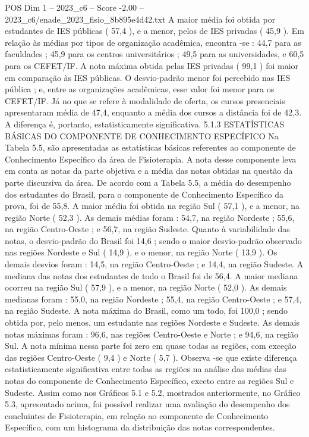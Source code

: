 \begin{textsample}{POS Dim 1 – 2023\_c6 – Score -2.00 – 2023\_c6/enade\_2023\_fisio\_8b895e4d42.txt}
A maior média foi obtida por estudantes de IES públicas ( 57,4 ), e a menor, pelos de IES privadas ( 45,9 ).
Em relação às médias por tipos de organização acadêmica, encontra -se : 44,7 para as faculdades ; 45,9 para os centros universitários ; 49,5 para as universidades, e 60,5 para os CEFET/IF.
A nota máxima obtida pelas IES privadas ( 99,1 ) foi maior em comparação às IES públicas.
O desvio-padrão menor foi percebido nas IES pública ; e, entre as organizações acadêmicas, esse valor foi menor para os CEFET/IF.
Já no que se refere à modalidade de oferta, os cursos presenciais apresentaram média de 47,4, enquanto a média dos cursos a distância foi de 42,3.
A diferença é, portanto, estatisticamente significativa. 5.1.3 ESTATÍSTICAS BÁSICAS DO COMPONENTE DE CONHECIMENTO ESPECÍFICO Na Tabela 5.5, são apresentadas as estatísticas básicas referentes ao componente de Conhecimento Específico da área de Fisioterapia.
A nota desse componente leva em conta as notas da parte objetiva e a média das notas obtidas na questão da parte discursiva da área.
De acordo com a Tabela 5.5, a média do desempenho dos estudantes do Brasil, para o componente de Conhecimento Específico da prova, foi de 55,8.
A maior média foi obtida na região Sul ( 57,1 ), e a menor, na região Norte ( 52,3 ).
As demais médias foram : 54,7, na região Nordeste ; 55,6, na região Centro-Oeste ; e 56,7, na região Sudeste.
Quanto à variabilidade das notas, o desvio-padrão do Brasil foi 14,6 ; sendo o maior desvio-padrão observado nas regiões Nordeste e Sul ( 14,9 ), e o menor, na região Norte ( 13,9 ).
Os demais desvios foram : 14,5, na região Centro-Oeste ; e 14,4, na região Sudeste.
A mediana das notas dos estudantes de todo o Brasil foi de 56,4.
A maior mediana ocorreu na região Sul ( 57,9 ), e a menor, na região Norte ( 52,0 ).
As demais medianas foram : 55,0, na região Nordeste ; 55,4, na região Centro-Oeste ; e 57,4, na região Sudeste.
A nota máxima do Brasil, como um todo, foi 100,0 ; sendo obtida por, pelo menos, um estudante nas regiões Nordeste e Sudeste.
As demais notas máximas foram : 96,6, nas regiões Centro-Oeste e Norte ; e 94,6, na região Sul.
A nota mínima nessa parte foi zero em quase todas as regiões, com exceção das regiões Centro-Oeste ( 9,4 ) e Norte ( 5,7 ).
Observa -se que existe diferença estatisticamente significativa entre todas as regiões na análise das médias das notas do componente de Conhecimento Específico, exceto entre as regiões Sul e Sudeste.
Assim como nos Gráficos 5.1 e 5.2, mostrados anteriormente, no Gráfico 5.3, apresentado acima, foi possível realizar uma avaliação do desempenho dos concluintes de Fisioterapia, em relação ao componente de Conhecimento Específico, com um histograma da distribuição das notas correspondentes.

\end{textsample}
